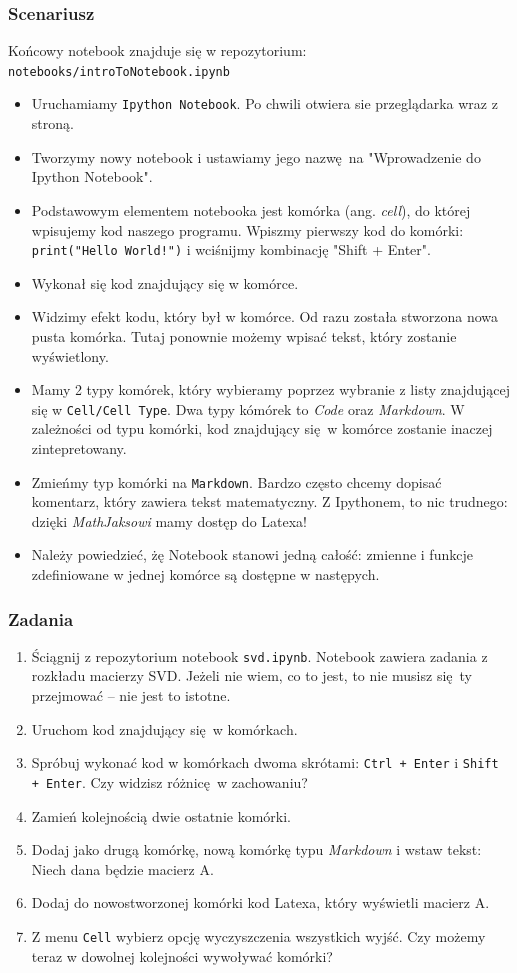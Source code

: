 \documentclass{mwart}
\begin{document}
\subsubsection{Scenariusz}
Końcowy notebook znajduje się w repozytorium: \texttt{notebooks/introToNotebook.ipynb}
\begin{itemize}
  \item Uruchamiamy \texttt{Ipython Notebook}. Po chwili otwiera sie przeglądarka wraz z
    stroną.
  \item Tworzymy nowy notebook i ustawiamy jego nazwę na "Wprowadzenie do Ipython
    Notebook".
  \item Podstawowym elementem notebooka jest komórka (ang. \emph{cell}), do której
    wpisujemy kod naszego programu. Wpiszmy pierwszy kod do komórki:
    \texttt{print("Hello World!")} i wciśnijmy kombinację "Shift + Enter".
  \item Wykonał się kod znajdujący się w komórce.
  \item Widzimy efekt kodu, który był w komórce. Od razu została stworzona nowa pusta
    komórka. Tutaj ponownie możemy wpisać tekst, który zostanie wyświetlony.
  \item Mamy 2 typy komórek, który wybieramy poprzez wybranie z listy znajdującej się w
    \texttt{Cell/Cell Type}. Dwa typy kómórek to \emph{Code} oraz \emph{Markdown}. W
    zależności od typu komórki, kod znajdujący się w komórce zostanie inaczej
    zintepretowany.
  \item Zmieńmy typ komórki na \texttt{Markdown}. Bardzo często chcemy dopisać
    komentarz, który zawiera tekst matematyczny. Z Ipythonem, to nic trudnego: dzięki
    \emph{MathJaksowi} mamy dostęp do Latexa!
  \item Należy powiedzieć, żę Notebook stanowi jedną całość: zmienne i funkcje
    zdefiniowane w jednej komórce są dostępne w następych.
\end{itemize}

\subsubsection{Zadania}
\begin{enumerate}
  \item Ściągnij z repozytorium notebook \texttt{svd.ipynb}. Notebook zawiera zadania z
    rozkładu macierzy SVD. Jeżeli nie wiem, co to jest, to nie musisz się ty przejmować
    -- nie jest to istotne.
  \item Uruchom kod znajdujący się w komórkach.
  \item Spróbuj wykonać kod w komórkach dwoma skrótami: \texttt{Ctrl + Enter} i
    \texttt{Shift + Enter}. Czy widzisz różnicę w zachowaniu?
  \item Zamień kolejnością dwie ostatnie komórki.
  \item Dodaj jako drugą komórkę, nową komórkę typu \emph{Markdown} i wstaw tekst:
    Niech dana będzie macierz A.
  \item Dodaj do nowostworzonej komórki kod Latexa, który wyświetli macierz A.
  \item Z menu \texttt{Cell} wybierz opcję wyczyszczenia wszystkich wyjść. Czy możemy
    teraz w dowolnej kolejności wywoływać komórki?
\end{enumerate}
\end{document}
